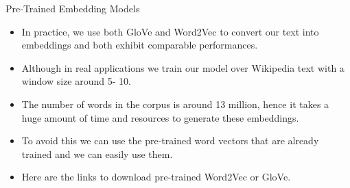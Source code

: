 \documentclass[11pt]{beamer}
\begin{document}
\begin{frame}{Pre-Trained Embedding Models}
	\begin{itemize}
		\item In practice, we use both GloVe and Word2Vec to convert our text into embeddings and both exhibit comparable performances. 
		\item Although in real applications we train our model over Wikipedia text with a window size around 5- 10. 
		\item The number of words in the corpus is around 13 million, hence it takes a huge amount of time and resources to generate these embeddings. 
		\item To avoid this we can use the pre-trained word vectors that are already trained and we can easily use them. 
		\item Here are the links to download pre-trained Word2Vec or GloVe.
	\end{itemize}
\end{frame}
\end{document}
